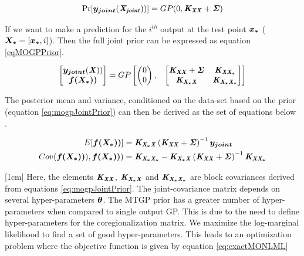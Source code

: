 \begin{equation}\label{eqNoisyMultiTaskPrior}
         \Pr[\boldsymbol{y_{joint}}(\bm{\mathit{X_{joint}}}))] = GP(0, \bm{\mathit{K_{XX}}} + \bm{\mathit{\Sigma}})
\end{equation}
      
If we want to make a prediction for the $i^{th}$ output at the test point $\boldsymbol{x_{*}}$ ($\boldsymbol{X_{*}} = [\boldsymbol{x_{*}}, i]$). Then the full joint prior can be expressed as equation \ref{eqMOGPPrior}.
 
 \begin{equation}\label{eqMOGPPrior}
 \begin{bmatrix}
   \boldsymbol{y_{joint}}(\bm{\mathit{X}}))\\ 
   \boldsymbol{f(X_{*}))}
   \end{bmatrix} = GP\begin{bmatrix}
   \begin{pmatrix}
   0\\ 
   0
   \end{pmatrix}, 
   & 
   \begin{bmatrix}
   \bm{\mathit{K_{XX}}} + \bm{\mathit{\Sigma}} & \bm{\mathit{K_{XX_{*}}}}\\ 
   \bm{\mathit{K_{X_{*}X}}} & \bm{\mathit{K_{X_{*}X_{*}}}}
   \end{bmatrix} 

   \end{bmatrix} 
 \end{equation}

  
The posterior mean and variance, conditioned on the data-set based on the prior (equation \ref{eq:mogpJointPrior}) can then be derived as the set of equations below .

\begin{align}
  E[\boldsymbol{f(X_{*}))}] & = \bm{\mathit{K_{X_{*}X}}}\left ( \bm{\mathit{K_{XX}}} + \bm{\mathit{\Sigma}} \right )^{-1}\boldsymbol{y_{joint}} \label{eq:predictiveMOMean} \\ 
  Cov(\boldsymbol{f(X_{*}))}), \boldsymbol{f(X_{*}))}) & = \bm{\mathit{K_{X_{*}X_{*}}}} - \bm{\mathit{K_{X_{*}X}}}\left ( \bm{\mathit{K_{XX}}} + \bm{\mathit{\Sigma}} \right )^{-1} \bm{\mathit{K_{XX_{*}}}} \label{eq:predictiveMOCovariance}
\end{align}
  
[1cm]
Here, the elements \(\bm{\mathit{K_{XX}}}\), \(\bm{\mathit{K_{X_{*}X}}}\) and \(\bm{\mathit{K_{X_{*}X_{*}}}}\) are block covariances derived from equations \ref{eq:mogpJointPrior}. The joint-covariance matrix depends on several hyper-parameters \(\boldsymbol{\theta}\). The MTGP prior has a greater number of hyper-parameters when compared to single output GP. This is due to the need to define hyper-parameters for the coregionalization matrix. We maximize the log-marginal likelihood to find a set of good hyper-parameters. This leads to an optimization problem where the objective function is given by equation \ref{eq:exactMONLML} 
  
